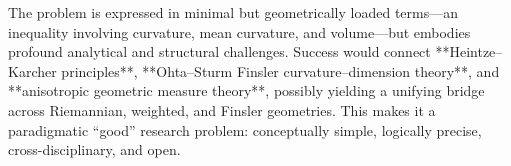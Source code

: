 The problem is expressed in minimal but geometrically loaded terms—an inequality involving curvature, mean curvature, and volume—but embodies profound analytical and structural challenges.  
Success would connect **Heintze–Karcher principles**, **Ohta–Sturm Finsler curvature–dimension theory**, and **anisotropic geometric measure theory**, possibly yielding a unifying bridge across Riemannian, weighted, and Finsler geometries. This makes it a paradigmatic “good” research problem: conceptually simple, logically precise, cross-disciplinary, and open.